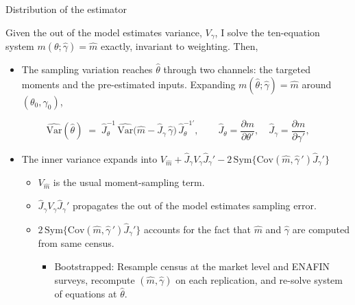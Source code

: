 \documentclass[11pt,aspectratio=169]{beamer}
\begin{document}

\begin{frame}[noframenumbering]{Distribution of the estimator}

Given the out of the model estimates variance, $V_{\gamma}$, I solve the ten-equation system $m(\theta;\widehat\gamma)=\hat m$ exactly, invariant to weighting. Then, 
\begin{itemize}
    \item The sampling variation reaches $\widehat\theta$ through two channels: the targeted moments and the pre-estimated inputs. Expanding $m(\widehat\theta;\widehat\gamma)=\hat m$ around $(\theta_{0},\gamma_{0})$,
\end{itemize}

\begin{equation*}
  \widehat{\mathrm{Var}}(\widehat\theta)
  \;=\;
  \hat J_{\theta}^{-1}\,
  \widehat{\mathrm{Var}}\!\big(\hat m - \hat J_{\gamma}\,
  \widehat\gamma\big)\,
  \hat J_{\theta}^{-1\prime},
  \qquad
  \hat J_{\theta}=\frac{\partial m}{\partial\theta'},\quad
  \hat J_{\gamma}=\frac{\partial m}{\partial\gamma'},
  \label{eq:id-var}
\end{equation*}

\begin{itemize}
    \item The inner variance expands into $V_{\hat m}+\hat J_{\gamma}V_{\gamma}\hat J_{\gamma}' -2\,\mathrm{Sym}\{\mathrm{Cov}(\hat m,\widehat\gamma\,') \hat J_{\gamma}'\}$
   \begin{itemize}
       \item $V_{\hat m}$ is the usual moment-sampling term.
       \item $\hat J_{\gamma}V_{\gamma}\hat J_{\gamma}'$ propagates the out of the model estimates sampling error.
       \item $2\,\mathrm{Sym}\{\mathrm{Cov}(\hat m,\widehat\gamma\,') \hat J_{\gamma}'\}$ accounts for the fact that $\hat m$ and $\widehat\gamma$ are computed from same census.
       \begin{itemize}
           \item Bootstrapped: Resample census at the market level and ENAFIN surveys, recompute $(\hat m,\widehat\gamma)$ on each replication, and re-solve system of equations at $\widehat\theta$.
       \end{itemize}
   \end{itemize}
\end{itemize}

\end{frame}
\end{document}
